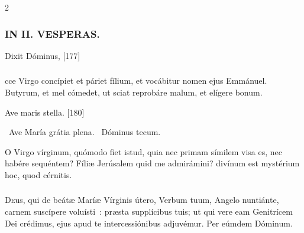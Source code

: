 \documentclass[9pt,twoside]{extarticle}
\begin{document}
\begin{multicols}{2}
{\subsubsection*{\center \textsc{IN II. VESPERAS.}}
\begin{tightlist}{}
\item {}
\item {} Dixit Dóminus,  [177]
\end{tightlist}

\subsubsection*{}
cce Virgo concípiet et páriet fílium, et vocábitur nomen ejus Emmánuel. Butyrum, et mel cómedet, ut sciat reprobáre malum, et elígere bonum.

\begin{tightlist}{}
\item {} Ave maris stella. [180]
\item {}~Ave María grátia plena. ~Dóminus tecum.

\item {} O Virgo vírginum, quómodo fiet istud, quia nec primam símilem visa es, nec habére sequéntem? Fíliæ Jerúsalem quid me admirámini? divínum est mystérium hoc, quod cérnitis.
\end{tightlist}

\subsubsection*{\center {}}
\lettrine{D}eus, qui de beátæ Maríæ Vírginis útero, Verbum tuum, Angelo nuntiánte, carnem suscípere voluísti~: præsta supplícibus tuis; ut qui vere eam Genitrícem Dei crédimus, ejus apud te intercessiónibus adjuvémur. Per eúmdem Dóminum.

}
\end{multicols}
\end{document}
